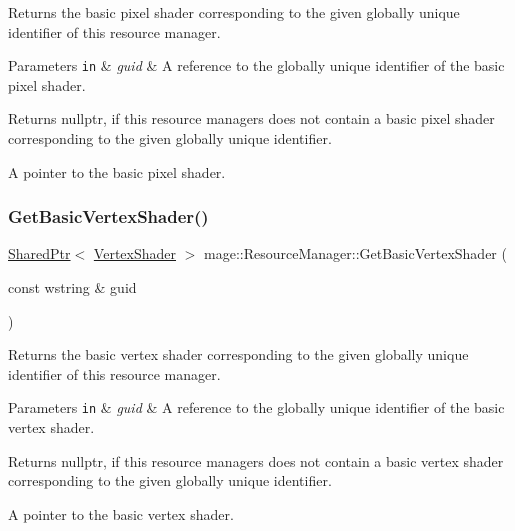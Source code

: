 Returns the basic pixel shader corresponding to the given globally unique identifier of this resource manager.


\begin{DoxyParams}[1]{Parameters}
\mbox{\tt in}  & {\em guid} & A reference to the globally unique identifier of the basic pixel shader. \\
\hline
\end{DoxyParams}
\begin{DoxyReturn}{Returns}
{\ttfamily nullptr}, if this resource managers does not contain a basic pixel shader corresponding to the given globally unique identifier. 

A pointer to the basic pixel shader. 
\end{DoxyReturn}
\hypertarget{classmage_1_1_resource_manager_a4a2b80e522616f6c5f23eae197f5c3dd}{}\label{classmage_1_1_resource_manager_a4a2b80e522616f6c5f23eae197f5c3dd} 
\subsubsection{\texorpdfstring{Get\+Basic\+Vertex\+Shader()}{GetBasicVertexShader()}}
{\footnotesize\ttfamily \hyperlink{namespacemage_a1e01ae66713838a7a67d30e44c67703e}{Shared\+Ptr}$<$ \hyperlink{classmage_1_1_vertex_shader}{Vertex\+Shader} $>$ mage\+::\+Resource\+Manager\+::\+Get\+Basic\+Vertex\+Shader (\begin{DoxyParamCaption}\item[{const wstring \&}]{guid }\end{DoxyParamCaption})\hspace{0.3cm}{\ttfamily [noexcept]}}

Returns the basic vertex shader corresponding to the given globally unique identifier of this resource manager.


\begin{DoxyParams}[1]{Parameters}
\mbox{\tt in}  & {\em guid} & A reference to the globally unique identifier of the basic vertex shader. \\
\hline
\end{DoxyParams}
\begin{DoxyReturn}{Returns}
{\ttfamily nullptr}, if this resource managers does not contain a basic vertex shader corresponding to the given globally unique identifier. 

A pointer to the basic vertex shader. 
\end{DoxyReturn}
\hypertarget{classmage_1_1_resource_manager_a93d34fd42062d9901435c8c469e7ecdf}{}\label{classmage_1_1_resource_manager_a93d34fd42062d9901435c8c469e7ecdf} 
